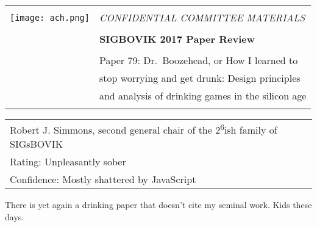 \documentclass[12pt]{article}
\begin{document}
{\sffamily
\begin{tabular}{ll}
\multirow{3}{*}{\texttt{[image: ach.png]}}\\
& \Large{\em CONFIDENTIAL COMMITTEE MATERIALS} \\
&\\
& \textbf{\Huge{SIGBOVIK 2017 Paper Review}} \\
&\\
& \LARGE{Paper 79: Dr.\ Boozehead, or How I learned to} \\
& \LARGE{stop worrying and get drunk: Design principles} \\
& \LARGE{and analysis of drinking games in the silicon age} \\
&\\
\hline
\end{tabular}}
\vspace{2em}
\thispagestyle{empty}

{\large\bf
\begin{tabular}{l}
Robert J. Simmons, second general chair of the 2\textsuperscript{6}ish family of SIGsBOVIK \\
Rating: Unpleasantly sober \\
Confidence: Mostly shattered by JavaScript \\
\end{tabular}}
\vspace{1em}

There is yet again a drinking paper that doesn't cite my seminal work.
Kids these days.
\end{document}
